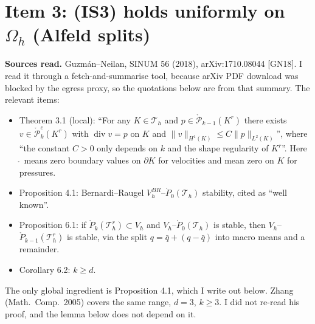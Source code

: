 \documentclass[11pt]{article}
\theoremstyle{remark}\newtheorem{remark}[theorem]{Remark}
\newcommand{\Oh}{\Omega_h}\newcommand{\Gh}{\Gamma_h}\newcommand{\hG}{h_\Gamma}\newcommand{\dn}{\partial_n}
\newcommand{\norm}[1]{\|#1\|}\newcommand{\ip}[2]{\langle #1,#2\rangle}\DeclareMathOperator{\curl}{curl}\DeclareMathOperator{\diam}{diam}
\begin{document}
\section{Item 3: (IS3) holds uniformly on $\Oh$ (Alfeld splits)}
\textbf{Sources read.} Guzm\'an--Neilan, SINUM 56 (2018), arXiv:1710.08044 [GN18]. I read it through a fetch-and-summarise tool, because arXiv PDF download was blocked by the egress proxy, so the quotations below are from that summary. The relevant items:
\begin{itemize}
\item Theorem 3.1 (local): ``For any $K\in\mathcal T_h$ and $p\in\mathring{\mathcal P}_{k-1}(K^r)$ there exists $v\in\mathring{\mathcal P}^c_k(K^r)$ with $\operatorname{div}v=p$ on $K$ and $\norm v_{H^1(K)}\le C\norm p_{L^2(K)}$'', where ``the constant $C>0$ only depends on $k$ and the shape regularity of $K^r$''. Here $\mathring{\ }$ means zero boundary values on $\partial K$ for velocities and mean zero on $K$ for pressures.
\item Proposition 4.1: Bernardi--Raugel $V_h^{BR}$--$\mathring P_0(\mathcal T_h)$ stability, cited as ``well known''.
\item Proposition 6.1: if $\mathring P_k(\mathcal T_h^r)\subset V_h$ and $V_h$--$\mathring P_0(\mathcal T_h)$ is stable, then $V_h$--$\mathring P_{k-1}(\mathcal T_h^r)$ is stable, via the split $q=\bar q+(q-\bar q)$ into macro means and a remainder.
\item Corollary 6.2: $k\ge d$.
\end{itemize}
The only global ingredient is Proposition 4.1, which I write out below. Zhang (Math.\ Comp.\ 2005) covers the same range, $d=3$, $k\ge3$. I did not re-read his proof, and the lemma below does not depend on it.
\end{document}
